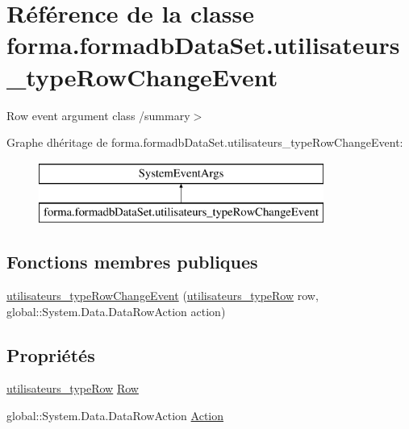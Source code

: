 \hypertarget{classforma_1_1formadb_data_set_1_1utilisateurs__type_row_change_event}{}\section{Référence de la classe forma.\+formadb\+Data\+Set.\+utilisateurs\+\_\+type\+Row\+Change\+Event}
\label{classforma_1_1formadb_data_set_1_1utilisateurs__type_row_change_event}


Row event argument class /summary$>$  


Graphe d\textquotesingle{}héritage de forma.\+formadb\+Data\+Set.\+utilisateurs\+\_\+type\+Row\+Change\+Event\+:\begin{figure}[H]
\begin{center}
\leavevmode
\includegraphics[height=2.000000cm]{classforma_1_1formadb_data_set_1_1utilisateurs__type_row_change_event}
\end{center}
\end{figure}
\subsection*{Fonctions membres publiques}
\begin{DoxyCompactItemize}
\item 
\hyperlink{classforma_1_1formadb_data_set_1_1utilisateurs__type_row_change_event_a9b49c470e87cc1a0b2f4871908a25879}{utilisateurs\+\_\+type\+Row\+Change\+Event} (\hyperlink{classforma_1_1formadb_data_set_1_1utilisateurs__type_row}{utilisateurs\+\_\+type\+Row} row, global\+::\+System.\+Data.\+Data\+Row\+Action action)
\end{DoxyCompactItemize}
\subsection*{Propriétés}
\begin{DoxyCompactItemize}
\item 
\hyperlink{classforma_1_1formadb_data_set_1_1utilisateurs__type_row}{utilisateurs\+\_\+type\+Row} \hyperlink{classforma_1_1formadb_data_set_1_1utilisateurs__type_row_change_event_a56f16fc805e9489e143f07c78c76f37e}{Row}
\item 
global\+::\+System.\+Data.\+Data\+Row\+Action \hyperlink{classforma_1_1formadb_data_set_1_1utilisateurs__type_row_change_event_a9f077fbbb710f9d3c3eab9bd12e24e80}{Action}
\end{DoxyCompactItemize}


